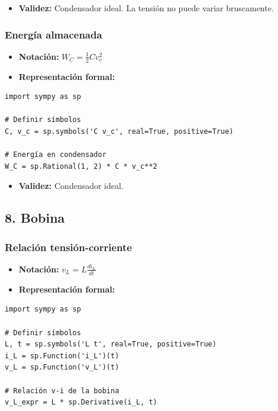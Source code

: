 \documentclass[11pt,a4paper]{article}
\begin{document}
\begin{itemize}[leftmargin=*,topsep=2pt,itemsep=1pt]
  \item \textbf{Validez:} Condensador ideal. La tensión no puede variar bruscamente.
\end{itemize}


\subsubsection*{Energía almacenada}


\begin{itemize}[leftmargin=*,topsep=2pt,itemsep=1pt]
  \item \textbf{Notación:} $W_C = \frac{1}{2} C v_c^2$
  \item \textbf{Representación formal:}
\end{itemize}


\begin{lstlisting}
import sympy as sp

# Definir símbolos
C, v_c = sp.symbols('C v_c', real=True, positive=True)

# Energía en condensador
W_C = sp.Rational(1, 2) * C * v_c**2
\end{lstlisting}


\begin{itemize}[leftmargin=*,topsep=2pt,itemsep=1pt]
  \item \textbf{Validez:} Condensador ideal.
\end{itemize}


\subsection*{8. Bobina}


\subsubsection*{Relación tensión-corriente}


\begin{itemize}[leftmargin=*,topsep=2pt,itemsep=1pt]
  \item \textbf{Notación:} $v_L = L \frac{di_L}{dt}$
  \item \textbf{Representación formal:}
\end{itemize}


\begin{lstlisting}
import sympy as sp

# Definir símbolos
L, t = sp.symbols('L t', real=True, positive=True)
i_L = sp.Function('i_L')(t)
v_L = sp.Function('v_L')(t)

# Relación v-i de la bobina
v_L_expr = L * sp.Derivative(i_L, t)
\end{lstlisting}
\end{document}
